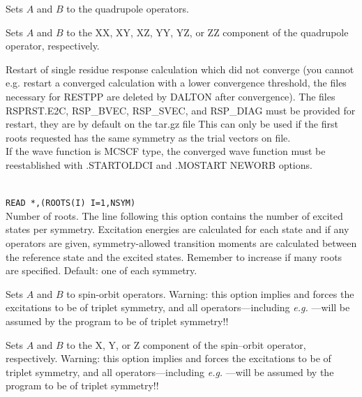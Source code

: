 \begin{description}
\item{}
Sets $A$ and $B$ to the quadrupole operators.

\item{}
Sets $A$ and $B$ to the XX, XY, XZ, YY, YZ, or ZZ component of the
quadrupole operator, respectively.

\item{}
Restart of single residue response
calculation which did not converge (you cannot e.g. restart a converged
calculation with a lower convergence threshold, the files necessary for
RESTPP are deleted by DALTON after convergence).
The files RSPRST.E2C, RSP\_BVEC, RSP\_SVEC, and RSP\_DIAG
must be provided for restart, they are by default on the tar.gz file
This can only be used if the first roots requested
has the same symmetry as the trial vectors on file.  \\
If the wave function is MCSCF type, the converged wave function must
be reestablished with .STARTOLDCI and .MOSTART NEWORB options.

\item{}\\
\verb|READ *,(ROOTS(I) I=1,NSYM)|\\
Number of roots.  The line following this option contains the number
of excited states per symmetry. Excitation
energies are calculated for each state and if
any operators are given,
symmetry-allowed transition moments are
calculated between the
reference state and the excited states.
Remember to increase  if many roots are specified.
Default: one of each symmetry.

\item{}
Sets $A$ and $B$ to spin-orbit operators.
Warning: this option implies  and
forces the excitations to be of triplet symmetry,
and all operators---including
{\it e.g.\/} ---will be assumed by the program to be of triplet symmetry!!

\item{}
Sets $A$ and $B$ to the X, Y, or Z component of the spin--orbit
operator, respectively.
Warning: this option implies  and
forces the excitations to be of triplet symmetry,
and all operators---including
{\it e.g.\/} ---will be assumed by the program to be of triplet symmetry!!


\end{description}
